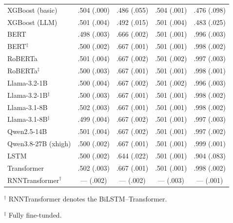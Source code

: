 \documentclass{article} %
\theoremstyle{plain}
\theoremstyle{definition}
\theoremstyle{remark}
\begin{document}
\begin{table}[h!]
\begin{tabular}{@{}lcccc@{}}
XGBoost (basic) & .504 (.000) & .486 (.055) & .504 (.001) & .476 (.098) \\
XGBoost (LLM) & .501 (.004) & .492 (.015) & .501 (.004) & .483 (.025) \\
BERT & .498 (.003) & .666 (.002) & .501 (.001) & .996 (.003) \\
BERT$^{\ddag}$ & .500 (.002) & .667 (.001) & .501 (.001) & .998 (.002) \\
RoBERTa & .501 (.004) & .667 (.002) & .501 (.002) & .997 (.003) \\
RoBERTa$^{\ddag}$ & .500 (.003) & .667 (.001) & .501 (.001) & .998 (.001) \\
Llama-3.2-1B & .500 (.004) & .667 (.002) & .501 (.002) & .996 (.003) \\
Llama-3.2-1B$^{\ddag}$ & .500 (.003) & .667 (.001) & .501 (.001) & .998 (.002) \\
Llama-3.1-8B & .502 (.003) & .667 (.001) & .501 (.001) & .998 (.002) \\
Llama-3.1-8B$^{\ddag}$ & .499 (.004) & .667 (.002) & .501 (.001) & .997 (.003) \\
Qwen2.5-14B & .501 (.004) & .667 (.002) & .501 (.001) & .997 (.002) \\
Qwen3.8-27B (xhigh) & .500 (.002) & .667 (.001) & .501 (.001) & .999 (.001) \\
LSTM & .500 (.002) & .644 (.022) & .501 (.001) & .904 (.083) \\
Transformer & .502 (.003) & .667 (.001) & .501 (.001) & .998 (.002) \\
RNNTransformer$^{\dagger}$ & --- (.002) & --- (.002) & --- (.003) & --- (.001) \\
\bottomrule
\end{tabular}

\par\smallskip
\begin{minipage}{\linewidth}
\footnotesize\raggedright
$^{\dagger}$ RNNTransformer denotes the BiLSTM--Transformer.\par
$^{\ddag}$ Fully fine-tunded.
\end{minipage}
\end{table}
\end{document}
